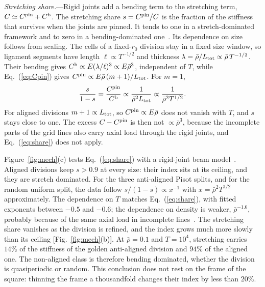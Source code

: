 \documentclass[aps,prl,twocolumn,superscriptaddress,amsmath,amssymb,floatfix]{revtex4-2}
\begin{document}
\textit{Stretching share.}---Rigid joints add a bending term to the stretching term, $C\simeq
C^{\rm pin}+C^{\rm b}$. The stretching share $s=C^{\rm pin}/C$ is the fraction of the stiffness
that survives when the joints are pinned. It tends to one in a stretch-dominated framework and
to zero in a bending-dominated one~\cite{deshpande2001}. Its dependence on size follows from
scaling. The cells of a fixed-$r_0$ division stay in a fixed size window, so ligament segments
have length $\ell\propto T^{-1/2}$ and thickness $\lambda=\bar\rho/L_{\rm tot}\propto
\bar\rho\,T^{-1/2}$. Their bending gives $C^{\rm b}\propto E(\lambda/\ell)^{3}\propto
E\bar\rho^{3}$, independent of $T$, while Eq.~(\ref{eq:Cpin}) gives $C^{\rm pin}\propto
E\bar\rho\,(m+1)/L_{\rm tot}$. For $m=1$,
\begin{equation}
\frac{s}{1-s}=\frac{C^{\rm pin}}{C^{\rm b}}\propto\frac{1}{\bar\rho^{2}L_{\rm tot}}
\propto\frac{1}{\bar\rho^{2}T^{1/2}} .
\label{eq:share}
\end{equation}
For aligned divisions $m+1\propto L_{\rm tot}$, so $C^{\rm pin}\propto E\bar\rho$ does not vanish
with $T$, and $s$ stays close to one. The excess $C-C^{\rm pin}$ is then not $\propto\bar\rho^{3}$,
because the incomplete parts of the grid lines also carry axial load through the rigid joints,
and Eq.~(\ref{eq:share}) does not apply.

Figure~\ref{fig:mech}(c) tests Eq.~(\ref{eq:share}) with a rigid-joint beam
model~\cite{supp}. Aligned divisions keep $s>0.9$ at every size: their index sits at its
ceiling, and they are stretch dominated. For the three anti-aligned Pisot splits, and for the
random uniform split, the data follow $s/(1-s)\propto x^{-1}$ with $x=\bar\rho^{2}T^{1/2}$
approximately. The dependence on $T$ matches Eq.~(\ref{eq:share}), with fitted exponents
between $-0.5$ and $-0.6$; the dependence on density is weaker, $\bar\rho^{-1.6}$, probably
because of the same axial load in incomplete lines~\cite{supp}. The stretching
share vanishes as the division is refined, and the index grows much more slowly than its
ceiling [Fig.~\ref{fig:mech}(b)]. At $\bar\rho=0.1$ and $T=10^{4}$, stretching carries $14\%$
of the stiffness of the golden anti-aligned division and $94\%$ of the aligned one. The
non-aligned class is therefore bending dominated, whether the division is quasiperiodic or
random.
This conclusion does not rest on the frame of the square: thinning the frame a thousandfold
changes their index by less than $20\%$.
\end{document}
